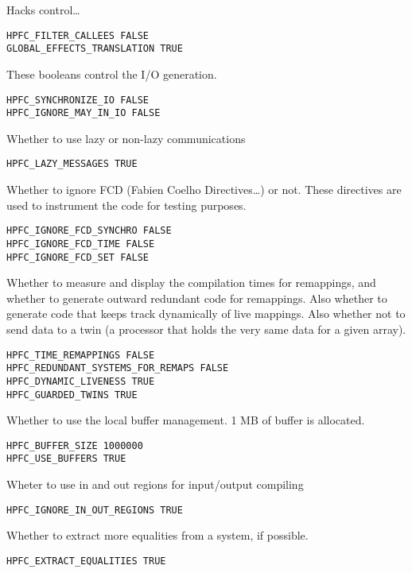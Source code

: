    Hacks control\ldots

\begin{verbatim}
HPFC_FILTER_CALLEES FALSE
GLOBAL_EFFECTS_TRANSLATION TRUE
\end{verbatim}

  These booleans control the I/O generation.

\begin{verbatim}
HPFC_SYNCHRONIZE_IO FALSE
HPFC_IGNORE_MAY_IN_IO FALSE
\end{verbatim}

  Whether to use lazy or non-lazy communications

\begin{verbatim}
HPFC_LAZY_MESSAGES TRUE
\end{verbatim}

Whether to ignore FCD (Fabien Coelho Directives\ldots) or not. These
directives are used to instrument the code for testing purposes.

\begin{verbatim}
HPFC_IGNORE_FCD_SYNCHRO FALSE
HPFC_IGNORE_FCD_TIME FALSE
HPFC_IGNORE_FCD_SET FALSE
\end{verbatim}

Whether to measure and display the compilation times for remappings,
and whether to generate outward redundant code for remappings. Also
whether to generate code that keeps track dynamically of live mappings. 
Also whether not to send data to a twin (a processor that holds the very
same data for a given array). 

\begin{verbatim}
HPFC_TIME_REMAPPINGS FALSE
HPFC_REDUNDANT_SYSTEMS_FOR_REMAPS FALSE
HPFC_DYNAMIC_LIVENESS TRUE
HPFC_GUARDED_TWINS TRUE
\end{verbatim}

Whether to use the local buffer management. 1 MB of buffer is allocated.

\begin{verbatim}
HPFC_BUFFER_SIZE 1000000
HPFC_USE_BUFFERS TRUE
\end{verbatim}

Wheter to use in and out regions for input/output compiling

\begin{verbatim}
HPFC_IGNORE_IN_OUT_REGIONS TRUE
\end{verbatim}

Whether to extract more equalities from a system, if possible.

\begin{verbatim}
HPFC_EXTRACT_EQUALITIES TRUE
\end{verbatim}

